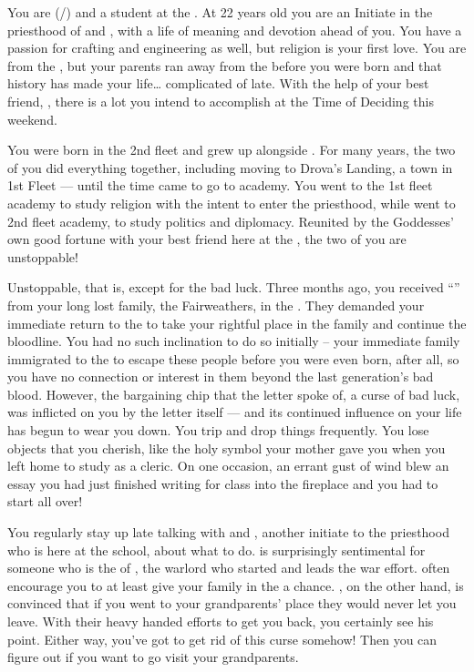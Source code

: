 \documentclass[char]{GL2020}
\begin{document}
\name{\cInitiate{}}

You are \cInitiate{\full} (\cInitiate{\they}/\cInitiate{\them}) and a student at the \pSchool{}. At 22 years old you are an Initiate in the priesthood of \cEbb{} and \cFlow{}, with a life of meaning and devotion ahead of you. You have a passion for crafting and engineering as well, but religion is your first love. You are from the \pShip{}, but your parents ran away from the \pFarm{} before you were born and that history has made your life\ldots{} complicated of late. With the help of your best friend, \cPresident{\full}, there is a lot you intend to accomplish at the Time of Deciding this weekend.

You were born in the 2nd fleet and grew up alongside \cPresident{}. For many years, the two of you did everything together, including moving to Drova's Landing, a town in 1st Fleet — until the time came to go to academy. You went to the 1st fleet academy to study religion with the intent to enter the priesthood, while \cPresident{\they} went to 2nd fleet academy, to study politics and diplomacy. Reunited by the Goddesses' own good fortune with your best friend here at the \pSchool{}, the two of you are unstoppable!

Unstoppable, that is, except for the bad luck. Three months ago, you received ``\iCursedLetter{}'' from your long lost family, the Fairweathers, in the \pFarm{}. They demanded your immediate return to the \pFarm{} to take your rightful place in the family and continue the bloodline. You had no such inclination to do so initially -- your immediate family immigrated to the \pShip{} to escape these people before you were even born, after all, so you have no connection or interest in them beyond the last generation's bad blood. However, the bargaining chip that the letter spoke of, a curse of bad luck, was inflicted on you by the letter itself — and its continued influence on your life has begun to wear you down. You trip and drop things frequently. You lose objects that you cherish, like the holy symbol your mother gave you when you left home to study as a cleric. On one occasion, an errant gust of wind blew an essay you had just finished writing for class into the fireplace and you had to start all over!

You regularly stay up late talking with \cPresident{} and \cWarlordDaughter{\full}, another initiate to the priesthood who is here at the school, about what to do. \cWarlordDaughter{} is surprisingly sentimental for someone who is the \cWarlordDaughter{\child} of \cLoud{\full}, the warlord who started and leads the \pShip{} war effort. \cWarlordDaughter{\They} often encourage\cWarlordDaughter{\plural} you to at least give your family in the \pFarm{} a chance. \cPresident{}, on the other hand, is convinced that if you went to your grandparents' place they would never let you leave. With their heavy handed efforts to get you back, you certainly see his point. Either way, you've got to get rid of this curse somehow! Then you can figure out if you want to go visit your grandparents. 
\end{document}
